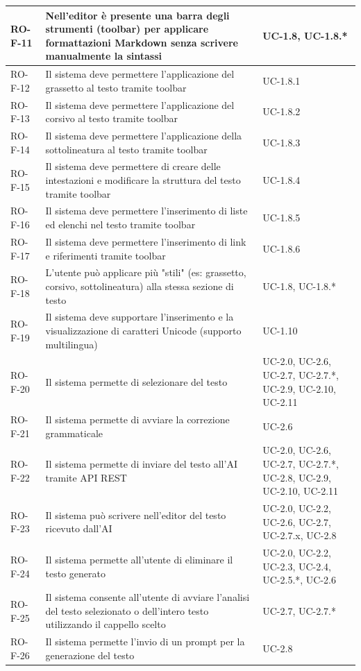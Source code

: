\documentclass[11pt,a4paper]{article}
\begin{document}
\begin{longtable}{|p{}|>{\raggedright\arraybackslash}p{}|p{}|}
\hline
RO-F-11 & Nell'editor è presente una barra degli strumenti (toolbar) per applicare formattazioni Markdown senza scrivere manualmente la sintassi & UC-1.8, UC-1.8.* \\
\hline
RO-F-12 & Il sistema deve permettere l'applicazione del grassetto al testo tramite toolbar & UC-1.8.1 \\
\hline
RO-F-13 & Il sistema deve permettere l'applicazione del corsivo al testo tramite toolbar & UC-1.8.2 \\
\hline
RO-F-14 & Il sistema deve permettere l'applicazione della sottolineatura al testo tramite toolbar & UC-1.8.3 \\
\hline
RO-F-15 & Il sistema deve permettere di creare delle intestazioni e modificare la struttura del testo tramite toolbar & UC-1.8.4 \\
\hline
RO-F-16 & Il sistema deve permettere l'inserimento di liste ed elenchi nel testo tramite toolbar & UC-1.8.5 \\
\hline
RO-F-17 & Il sistema deve permettere l'inserimento di link e riferimenti tramite toolbar & UC-1.8.6 \\
\hline
RO-F-18 & L'utente può applicare più "stili" (es: grassetto, corsivo, sottolineatura) alla stessa sezione di testo & UC-1.8, UC-1.8.* \\
\hline
RO-F-19 & Il sistema deve supportare l'inserimento e la visualizzazione di caratteri Unicode (supporto multilingua) & UC-1.10 \\
\hline
RO-F-20 & Il sistema permette di selezionare del testo & UC-2.0, UC-2.6, UC-2.7, UC-2.7.*, UC-2.9, UC-2.10, UC-2.11 \\
\hline
RO-F-21 & Il sistema permette di avviare la correzione grammaticale & UC-2.6 \\
\hline
RO-F-22 & Il sistema permette di inviare del testo all'AI tramite API REST & UC-2.0, UC-2.6, UC-2.7, UC-2.7.*, UC-2.8, UC-2.9, UC-2.10, UC-2.11 \\
\hline
RO-F-23 & Il sistema può scrivere nell'editor del testo ricevuto dall'AI & UC-2.0, UC-2.2, UC-2.6, UC-2.7, UC-2.7.x, UC-2.8 \\
\hline
RO-F-24 & Il sistema permette all'utente di eliminare il testo generato & UC-2.0, UC-2.2, UC-2.3, UC-2.4, UC-2.5.*, UC-2.6 \\
\hline
RO-F-25 & Il sistema consente all'utente di avviare l'analisi del testo selezionato o dell'intero testo utilizzando il cappello scelto & UC-2.7, UC-2.7.* \\
\hline
RO-F-26 & Il sistema permette l'invio di un prompt per la generazione del testo & UC-2.8 \\

\end{longtable}
\end{document}
